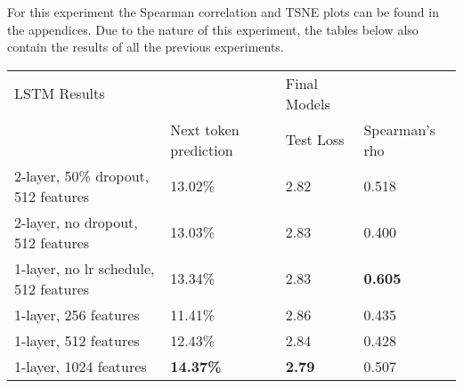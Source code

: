 For this experiment the Spearman correlation and TSNE plots can be found in the appendices. Due to the nature of this experiment, the tables below also contain the results of all the previous experiments.
\begin{table}[!ht]
  \centering
\begin{tabular}{|l|lll|}
\hline
LSTM Results                          &                                                     & Final Models                       &                \\ \cline{2-4}
                                      & \multicolumn{1}{l|}{Next token prediction}          & \multicolumn{1}{l|}{Test Loss}     & Spearman's rho \\ \hline
2-layer, 50\% dropout, 512 features   & \multicolumn{1}{l|}{13.02\%}                        & \multicolumn{1}{l|}{2.82}          & 0.518          \\ \hline
2-layer, no dropout, 512 features     & \multicolumn{1}{l|}{13.03\%}                        & \multicolumn{1}{l|}{2.83}          & 0.400          \\ \hline
1-layer, no lr schedule, 512 features & \multicolumn{1}{l|}{13.34\%}                        & \multicolumn{1}{l|}{2.83}          & \textbf{0.605} \\ \hline
1-layer, 256 features                 & \multicolumn{1}{l|}{11.41\%}                        & \multicolumn{1}{l|}{2.86}          & 0.435          \\ \hline
1-layer, 512 features                 & \multicolumn{1}{l|}{12.43\%}                        & \multicolumn{1}{l|}{2.84}          & 0.428          \\ \hline
1-layer, 1024 features                & \multicolumn{1}{l|}{\textbf{14.37\%}}               & \multicolumn{1}{l|}{\textbf{2.79}} & 0.507          \\ \hline
\end{tabular}
\end{table}

